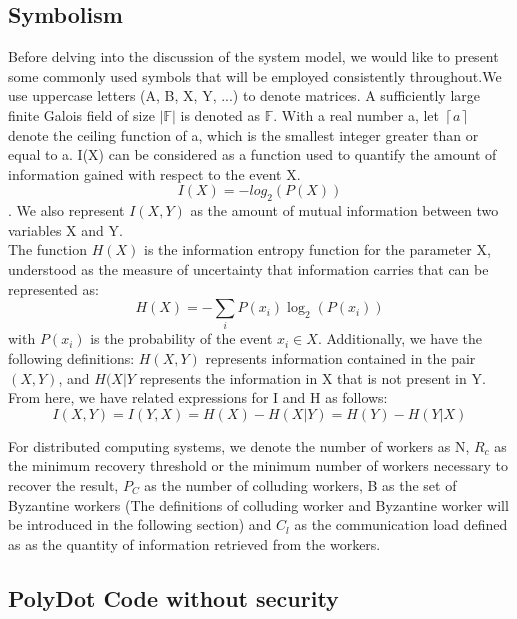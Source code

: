 \documentclass[lettersize,journal]{IEEEtran}
\begin{document}
\subsection{Symbolism}
Before delving into the discussion of the system model, we would like to present some commonly used symbols that will be employed consistently throughout.We use uppercase letters (A, B, X, Y, ...) to denote matrices. A sufficiently large finite Galois field of size $|\mathbb{F}|$ is denoted as $\mathbb{F}$. With a real number a, let $\left\lceil a\right\rceil$ denote the ceiling function of a, which is the smallest integer greater than or equal to a. I(X) can be considered as a function used to quantify the amount of information gained with respect to the event X.
\begin{equation}
    I(X) = -log_2(P(X))
\end{equation}.
 We also represent $I(X, Y)$ as the amount of mutual information between two variables X and Y.\\
The function $H(X)$ is the information entropy function for the parameter X, understood as the measure of uncertainty that information carries that can be represented as:
\begin{equation}
    H(X) = - \sum_{i} P(x_i) \log_2(P(x_i))
\end{equation}
with $P(x_i)$ is the probability of the event $x_i \in X$. Additionally, we have the following definitions: $H(X,Y)$ represents information contained in the pair $(X, Y)$, and $H(X|Y$
 represents the information in X that is not present in Y. From here, we have related expressions for I and H as follows:
\begin{equation}
    I(X,Y) = I(Y,X) = H(X) - H(X|Y)
                    = H(Y) - H(Y|X)
 \end{equation}

For distributed computing systems, we denote the number of workers as N,
 $R_c$ as the minimum recovery threshold or the minimum number of workers necessary to recover the result, $P_C$ as the number of colluding workers, B as the set of Byzantine workers (The definitions of colluding worker and Byzantine worker will be introduced in the following section) and $C_l$ as the communication load defined as as the quantity of information retrieved from the workers.






\subsection{PolyDot Code without security}
\end{document}
